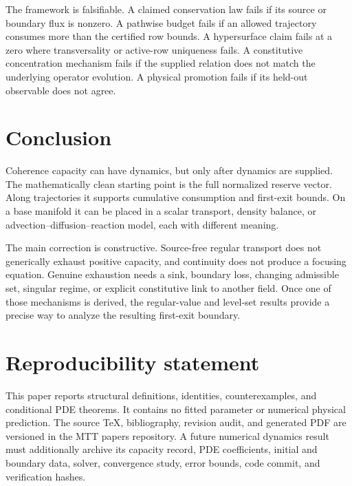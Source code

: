 \documentclass[11pt]{article}
\theoremstyle{definition}
\theoremstyle{remark}
\begin{document}
The framework is falsifiable.  A claimed conservation law fails if its
source or boundary flux is nonzero.  A pathwise budget fails if an allowed
trajectory consumes more than the certified row bounds.  A hypersurface
claim fails at a zero where transversality or active-row uniqueness fails.
A constitutive concentration mechanism fails if the supplied relation
does not match the underlying operator evolution.  A physical promotion
fails if its held-out observable does not agree.

\section{Conclusion}

Coherence capacity can have dynamics, but only after dynamics are supplied.
The mathematically clean starting point is the full normalized reserve
vector.  Along trajectories it supports cumulative consumption and
first-exit bounds.  On a base manifold it can be placed in a scalar
transport, density balance, or advection--diffusion--reaction model, each
with different meaning.

The main correction is constructive.  Source-free regular transport does
not generically exhaust positive capacity, and continuity does not produce
a focusing equation.  Genuine exhaustion needs a sink, boundary loss,
changing admissible set, singular regime, or explicit constitutive link to
another field.  Once one of those mechanisms is derived, the regular-value
and level-set results provide a precise way to analyze the resulting
first-exit boundary.

\section*{Reproducibility statement}

This paper reports structural definitions, identities, counterexamples,
and conditional PDE theorems.  It contains no fitted parameter or
numerical physical prediction.  The source TeX, bibliography, revision
audit, and generated PDF are versioned in the MTT papers repository.  A
future numerical dynamics result must additionally archive its capacity
record, PDE coefficients, initial and boundary data, solver, convergence
study, error bounds, code commit, and verification hashes.



\end{document}
